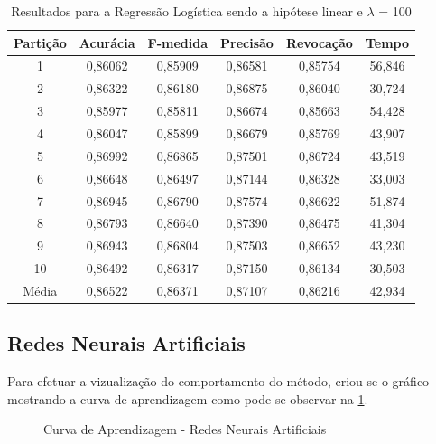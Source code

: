 \begin{table}[h]
\centering
\caption{Resultados para a Regressão Logística sendo a hipótese linear e \(\lambda\) = 100}
\vspace{0.2cm}
\begin{tabular}{c|c|c|c|c|c}
Partição & Acurácia & F-medida & Precisão & Revocação & Tempo \\
\hline
1  & 0,86062 & 0,85909 & 0,86581 & 0,85754 & 56,846 \\      
2  & 0,86322 & 0,86180 & 0,86875 & 0,86040 & 30,724 \\      
3  & 0,85977 & 0,85811 & 0,86674 & 0,85663 & 54,428 \\      
4  & 0,86047 & 0,85899 & 0,86679 & 0,85769 & 43,907 \\      
5  & 0,86992 & 0,86865 & 0,87501 & 0,86724 & 43,519 \\      
6  & 0,86648 & 0,86497 & 0,87144 & 0,86328 & 33,003 \\      
7  & 0,86945 & 0,86790 & 0,87574 & 0,86622 & 51,874 \\    
8  & 0,86793 & 0,86640 & 0,87390 & 0,86475 & 41,304 \\      
9  & 0,86943 & 0,86804 & 0,87503 & 0,86652 & 43,230 \\      
10 & 0,86492 & 0,86317 & 0,87150 & 0,86134 & 30,503 \\
\hline
Média & 0,86522 & 0,86371 & 0,87107 & 0,86216 & 42,934

\end{tabular} 
\label{table:resultadosRL}
\end{table}

\subsection{Redes Neurais Artificiais}
	
Para efetuar a vizualização do comportamento do método, criou-se o gráfico mostrando a curva de aprendizagem como pode-se observar na \ref{fig:RNA}.

\begin{figure}[h]
	\centering
{}
\caption{Curva de Aprendizagem - Redes Neurais Artificiais}
\label{fig:RNA}
\end{figure}

